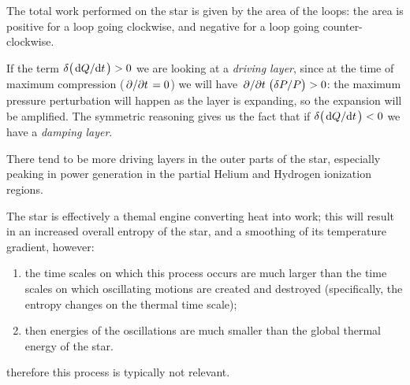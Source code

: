 \documentclass[main.tex]{subfiles}
\begin{document}
The total work performed on the star is given by the area of the loops: the area is positive for a loop going clockwise, and negative for a loop going counter-clockwise.

If the term \(\delta \qty(\dv*{Q}{t})>0\) we are looking at a \emph{driving layer}, since at the time of maximum compression (\(\pdv*{}{t} (\delta \rho  / \rho ) = 0\)) we will have \(\pdv*{}{t} \qty(\delta P / P) > 0\): the maximum pressure perturbation will happen as the layer is expanding, so the expansion will be amplified.
The symmetric reasoning gives us the fact that if \(\delta \qty(\dv*{Q}{t}) < 0\) we have a \emph{damping layer}. 

There tend to be more driving layers in the outer parts of the star, especially peaking in power generation in the partial Helium and Hydrogen ionization regions.  


\begin{bluebox}
The star is effectively a themal engine converting heat into work; this will result in an increased overall entropy of the star, and a smoothing of its temperature gradient, however:
%
\begin{enumerate}
\item the time scales on which this process occurs are much larger than the time scales on which oscillating motions are created and destroyed (specifically, the entropy changes on the thermal time scale);
\item then energies of the oscillations are much smaller than the global thermal energy of the star.
\end{enumerate}
%
therefore this process is typically not relevant.
\end{bluebox}
\end{document}
